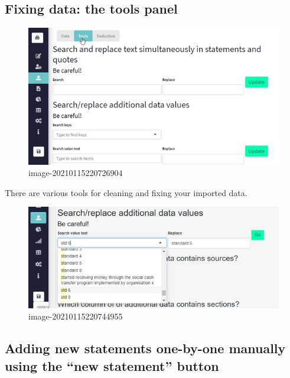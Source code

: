 \documentclass[
]{book}
\begin{document}
\hypertarget{fixing-data-the-tools-panel}{%
\subsection{Fixing data: the tools panel}\label{fixing-data-the-tools-panel}}

\begin{figure}
\centering
\includegraphics{_assets/image-20210115220726904.png}
\caption{image-20210115220726904}
\end{figure}

There are various tools for cleaning and fixing your imported data.

\begin{figure}
\centering
\includegraphics{_assets/image-20210115220744955.png}
\caption{image-20210115220744955}
\end{figure}

\hypertarget{adding-new-statements-one-by-one-manually-using-the-new-statement-button}{%
\subsection{Adding new statements one-by-one manually using the ``new statement'' button}\label{adding-new-statements-one-by-one-manually-using-the-new-statement-button}}
\end{document}

